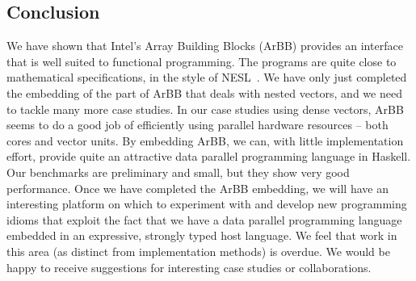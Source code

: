 \subsection{Conclusion} 
We have shown that Intel's Array Building Blocks (ArBB) provides
an interface that is well suited to functional programming. 
The programs are quite close to mathematical specifications, in the style of NESL~\cite{NESL}. We have only just completed the embedding of the part of ArBB that deals with nested vectors, and we need to tackle many more case studies.
In our case studies using dense vectors, ArBB seems to do a good job of efficiently using parallel
hardware resources -- both cores and vector units.
By
embedding ArBB, we can, with little implementation effort, provide
quite an attractive data parallel programming language in Haskell.
Our benchmarks are preliminary and small, but they show very good performance.
Once we have completed the ArBB embedding, we will have an interesting platform on which to
experiment with and develop new programming idioms that exploit the fact
that we have a data parallel programming language embedded in an
expressive, strongly typed host language.
We feel that work in this area (as distinct from implementation methods)
is overdue. We would be happy to receive suggestions
for interesting case studies or collaborations.

